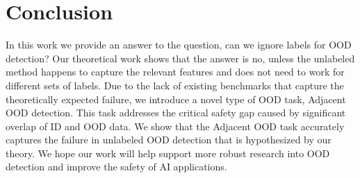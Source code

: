 \documentclass{article} %
\theoremstyle{plain}
\theoremstyle{definition}
\theoremstyle{remark}
\begin{document}

\vspace{-6mm}\section{Conclusion}\vspace{-2mm}

In this work we provide an answer to the question, can we ignore labels for OOD detection? Our theoretical work shows that the answer is no, unless the unlabeled method happens to capture the relevant features and does not need to work for different sets of labels. Due to the lack of existing benchmarks that capture the theoretically expected failure, we introduce a novel type of OOD task, Adjacent OOD detection. This task addresses the critical safety gap caused by significant overlap of ID and OOD data. We show that the Adjacent OOD task accurately captures the failure in unlabeled OOD detection that is hypothesized by our theory. We hope our work will help support more robust research into OOD detection and improve the safety of AI applications. 



\end{document}
